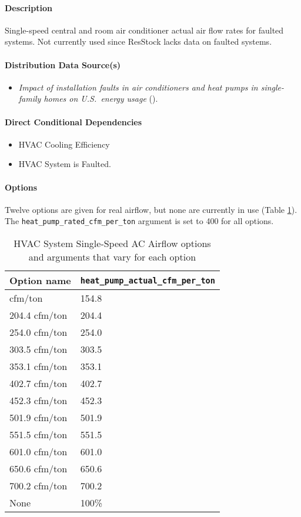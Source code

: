 \paragraph{Description}
Single-speed central and room air conditioner actual air flow rates for faulted systems. Not currently used since ResStock lacks data on faulted systems. 

\paragraph{Distribution Data Source(s)}
\begin{itemize}
\item 

\textit{Impact of installation faults in air conditioners and heat pumps in single-family homes on U.S.~energy usage} (\cite{Winkler2020}). 
\end{itemize}
\paragraph{Direct Conditional Dependencies}
\begin{itemize}
    \item HVAC Cooling Efficiency
    \item HVAC System is Faulted.
\end{itemize}

\paragraph{Options}
Twelve options are given for real airflow, but none are currently in use (Table \ref{table:hc_opt_hvac_ss_ac_airflow}). The \texttt{heat\_pump\_rated\_cfm\_per\_ton} argument is set to 400 for all options.

\begin{longtable}[]{|p{3.5cm}|p{6cm}|}\caption{HVAC System Single-Speed AC Airflow options and arguments that vary for each option} \label{table:hc_opt_hvac_ss_ac_airflow} \\
\toprule\noalign{}
Option name &

\texttt{heat\_pump\_actual\_cfm\_per\_ton} \\
\midrule\noalign{}
\endhead
\bottomrule\noalign{}
\endlastfoot
154.8 cfm/ton & 154.8 \\
204.4 cfm/ton & 204.4 \\
254.0 cfm/ton & 254.0 \\
303.5 cfm/ton & 303.5 \\
353.1 cfm/ton & 353.1 \\
402.7 cfm/ton & 402.7 \\
452.3 cfm/ton & 452.3 \\
501.9 cfm/ton & 501.9 \\
551.5 cfm/ton & 551.5 \\
601.0 cfm/ton & 601.0 \\
650.6 cfm/ton & 650.6 \\
700.2 cfm/ton & 700.2 \\
None & 100\% \\
\end{longtable}

